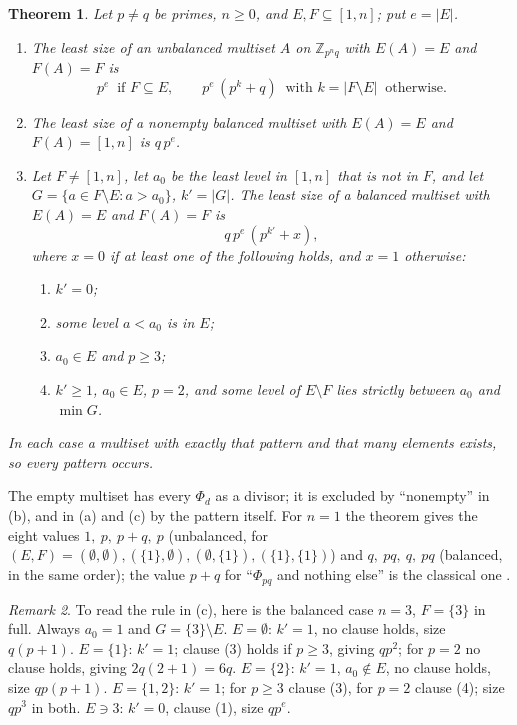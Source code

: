 \documentclass[11pt,a4paper]{amsart}
\newtheorem{theorem}{Theorem}
\theoremstyle{definition}
\theoremstyle{remark}
\newtheorem{remark}[theorem]{Remark}
\newcommand{\Z}{\mathbb{Z}}
\begin{document}
\begin{theorem}\label{thm:main}
Let $p\ne q$ be primes, $n\ge 0$, and $E,F\subseteq[1,n]$; put $e=|E|$.
\begin{enumerate}
\item[(a)] The least size of an unbalanced multiset $A$ on $\Z_{p^nq}$ with $E(A)=E$ and $F(A)=F$ is
\[ p^{e}\ \text{ if } F\subseteq E,\qquad p^{e}\,(p^{k}+q)\ \text{ with } k=|F\setminus E|\ \text{ otherwise.} \]
\item[(b)] The least size of a nonempty balanced multiset with $E(A)=E$ and $F(A)=[1,n]$ is $q\,p^{e}$.
\item[(c)] Let $F\ne[1,n]$, let $a_0$ be the least level in $[1,n]$ that is not in $F$, and let
$G=\{a\in F\setminus E:a>a_0\}$, $k'=|G|$. The least size of a balanced multiset with $E(A)=E$ and
$F(A)=F$ is \[ q\,p^{e}\,(p^{k'}+x), \] where $x=0$ if at least one of the following holds, and $x=1$
otherwise:
 \begin{enumerate}
 \item[(1)] $k'=0$;
 \item[(2)] some level $a<a_0$ is in $E$;
 \item[(3)] $a_0\in E$ and $p\ge 3$;
 \item[(4)] $k'\ge1$, $a_0\in E$, $p=2$, and some level of $E\setminus F$ lies strictly between $a_0$ and $\min G$.
 \end{enumerate}
\end{enumerate}
In each case a multiset with exactly that pattern and that many elements exists, so every pattern occurs.
\end{theorem}

The empty multiset has every $\Phi_d$ as a divisor; it is excluded by ``nonempty'' in (b), and in (a) and
(c) by the pattern itself. For $n=1$ the theorem gives the eight values
$1,\ p,\ p+q,\ p$ (unbalanced, for $(E,F)=(\emptyset,\emptyset),(\{1\},\emptyset),(\emptyset,\{1\}),(\{1\},\{1\})$)
and $q,\ pq,\ q,\ pq$ (balanced, in the same order); the value $p+q$ for ``$\Phi_{pq}$ and nothing
else'' is the classical one \cite{LL}. 
\begin{remark}\label{rem:example}
To read the rule in (c), here is the balanced case $n=3$, $F=\{3\}$ in full. Always $a_0=1$ and $G=\{3\}\setminus E$.
$E=\emptyset$: $k'=1$, no clause holds, size $q(p+1)$. $E=\{1\}$: $k'=1$; clause (3) holds if $p\ge 3$, giving
$qp^2$; for $p=2$ no clause holds, giving $2q(2+1)=6q$. $E=\{2\}$: $k'=1$, $a_0\notin E$, no clause holds,
size $qp(p+1)$. $E=\{1,2\}$: $k'=1$; for $p\ge3$ clause (3), for $p=2$ clause (4); size $qp^3$ in both.
$E\ni 3$: $k'=0$, clause (1), size $qp^{e}$.
\end{remark}
\end{document}
